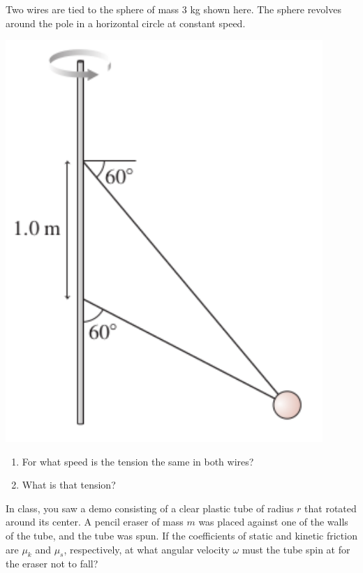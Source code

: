 \documentclass[12pt]{article}
\begin{document}
\begin{enumerate}
\begin{minipage}{0.7\textwidth}
\item Two wires are tied to the sphere of mass 3 kg shown here. The sphere
revolves around the pole in a horizontal circle at constant speed.  

  \end{minipage}
  \begin{minipage}{0.3\textwidth}
\centerline{\includegraphics[width=0.9\textwidth]{problem837.png}}
  \end{minipage}

\begin{enumerate}
\item For what speed is the tension the same in both wires?
\item What is that tension?
\end{enumerate}

\item In class, you saw a demo consisting of a clear plastic tube of radius $r$ that rotated around its center. 
A pencil eraser of mass $m$ was placed against one of the walls of the tube, and the tube was spun.
If the coefficients of static and kinetic friction are $\mu_k$ and $\mu_s$, respectively, at what angular
velocity $\omega$ must the tube spin at for the eraser not to fall?


\end{enumerate}
\end{document}
